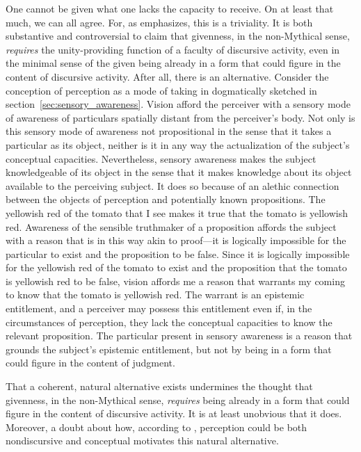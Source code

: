 \documentclass[12pt]{article}
\begin{document}
One cannot be given what one lacks the capacity to receive. On at least that much, we can all agree. For, as \citet{Travis:2008uq} emphasizes, this is a triviality. It is both substantive and controversial to claim that givenness, in the non-Mythical sense, \emph{requires} the unity-providing function of a faculty of discursive activity, even in the minimal sense of the given being already in a form that could figure in the content of discursive activity. After all, there is an alternative. Consider the conception of perception as a mode of taking in dogmatically sketched in section~\ref{sec:sensory_awareness}. Vision afford the perceiver with a sensory mode of awareness of particulars spatially distant from the perceiver's body. Not only is this sensory mode of awareness not propositional in the sense that it takes a particular as its object, neither is it in any way the actualization of the subject's conceptual capacities. Nevertheless, sensory awareness makes the subject knowledgeable of its object in the sense that it makes knowledge about its object available to the perceiving subject. It does so because of an alethic connection between the objects of perception and potentially known propositions. The yellowish red of the tomato that I see makes it true that the tomato is yellowish red. Awareness of the sensible truthmaker of a proposition affords the subject with a reason that is in this way akin to proof---it is logically impossible for the particular to exist and the proposition to be false. Since it is logically impossible for the yellowish red of the tomato to exist and the proposition that the tomato is yellowish red to be false, vision affords me a reason that warrants my coming to know that the tomato is yellowish red. The warrant is an epistemic entitlement, and a perceiver may possess this entitlement even if, in the circumstances of perception, they lack the conceptual capacities to know the relevant proposition. The particular present in sensory awareness is a reason that grounds the subject's epistemic entitlement, but not by being in a form that could figure in the content of judgment. %

That a coherent, natural alternative exists undermines the thought that givenness, in the non-Mythical sense, \emph{requires} being already in a form that could figure in the content of discursive activity. It is at least unobvious that it does. Moreover, a doubt about how, according to \citet{McDowell:2008fk}, perception could be both nondiscursive and conceptual motivates this natural alternative.
\end{document}

